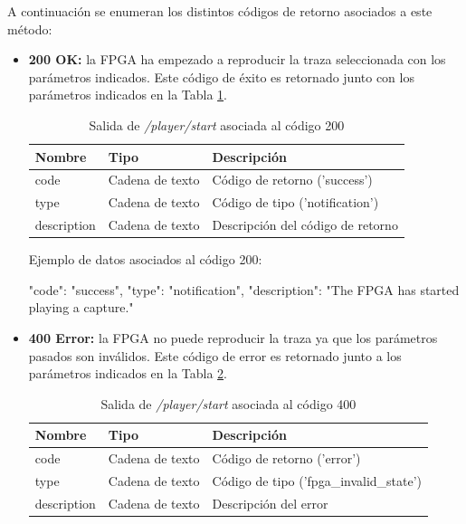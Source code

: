 A continuación se enumeran los distintos códigos de retorno asociados a este método:
\begin{itemize}

\item{\textbf{200 OK:} la \gls{FPGA} ha empezado a reproducir la \gls{traza} seleccionada con los parámetros indicados. Este código de éxito es retornado junto con los parámetros indicados en la Tabla \ref{extra:api:playerstart:ok}.
\begin{table}[H]
\centering
\begin{tabular}{|l|l|l|}
\hline
\rowcolor[HTML]{F5F5F5}
\textbf{Nombre}  & \textbf{Tipo}   & \textbf{Descripción}              \\ \hline
code             & Cadena de texto & Código de retorno ('success')     \\ \hline
type             & Cadena de texto & Código de tipo ('notification')   \\ \hline
description      & Cadena de texto & Descripción del código de retorno \\ \hline
\end{tabular}
\caption{Salida de \textit{/player/start} asociada al código 200}
\label{extra:api:playerstart:ok}
\end{table}
\begin{minipage}{\textwidth}
Ejemplo de datos asociados al código 200:

\begin{code}[language=json]
{
  "code": "success",
  "type": "notification",
  "description": "The FPGA has started playing a capture."
}
\end{code}
\end{minipage}
}

\item{\textbf{400 Error:} la \gls{FPGA} no puede reproducir la \gls{traza} ya que los parámetros pasados son inválidos. Este código de error es retornado junto a los parámetros indicados en la Tabla \ref{extra:api:playerstart:error400}.
\begin{table}[H]
\centering
\begin{tabular}{|l|l|l|}
\hline
\rowcolor[HTML]{F5F5F5}
\textbf{Nombre}  & \textbf{Tipo}   & \textbf{Descripción}                    \\ \hline
code             & Cadena de texto & Código de retorno ('error')             \\ \hline
type             & Cadena de texto & Código de tipo ('fpga\_invalid\_state') \\ \hline
description      & Cadena de texto & Descripción del error                   \\ \hline
\end{tabular}
\caption{Salida de \textit{/player/start} asociada al código 400}
\label{extra:api:playerstart:error400}
\end{table}

}
\end{itemize}
